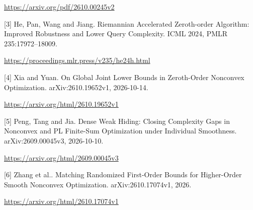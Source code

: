 \documentclass[10pt,a4paper]{article}
\begin{document}
\url{https://arxiv.org/pdf/2610.00245v2}

[3] He, Pan, Wang and Jiang. Riemannian Accelerated Zeroth-order Algorithm: Improved Robustness and Lower Query Complexity. ICML 2024, PMLR 235:17972--18009.

\url{https://proceedings.mlr.press/v235/he24h.html}

[4] Xia and Yuan. On Global Joint Lower Bounds in Zeroth-Order Nonconvex Optimization. arXiv:2610.19652v1, 2026-10-14.

\url{https://arxiv.org/html/2610.19652v1}

[5] Peng, Tang and Jia. Dense Weak Hiding: Closing Complexity Gaps in Nonconvex and PL Finite-Sum Optimization under Individual Smoothness. arXiv:2609.00045v3, 2026-10-10.

\url{https://arxiv.org/html/2609.00045v3}

[6] Zhang et al.. Matching Randomized First-Order Bounds for Higher-Order Smooth Nonconvex Optimization. arXiv:2610.17074v1, 2026.

\url{https://arxiv.org/html/2610.17074v1}
\end{document}
